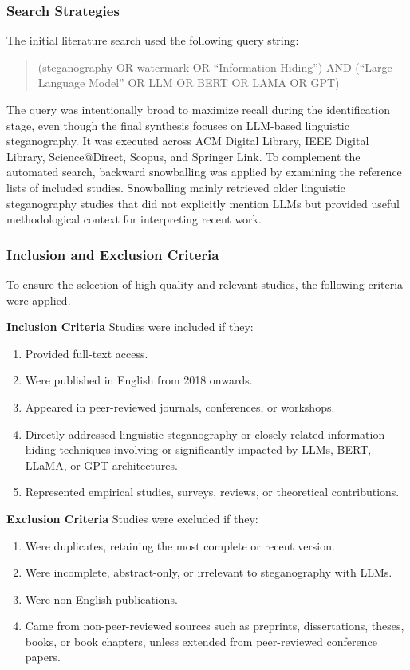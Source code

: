 \subsubsection{Search Strategies}
The initial literature search used the following query string:
\begin{quote}
	\small (steganography OR watermark OR ``Information Hiding'') AND (``Large Language Model'' OR LLM OR BERT OR LAMA OR GPT)
\end{quote}

The query was intentionally broad to maximize recall during the identification stage, even though the final synthesis focuses on LLM-based linguistic steganography. It was executed across ACM Digital Library, IEEE Digital Library, Science@Direct, Scopus, and Springer Link. To complement the automated search, backward snowballing was applied by examining the reference lists of included studies. Snowballing mainly retrieved older linguistic steganography studies that did not explicitly mention LLMs but provided useful methodological context for interpreting recent work.

\subsubsection{Inclusion and Exclusion Criteria}
To ensure the selection of high-quality and relevant studies, the following criteria were applied.

\textbf{Inclusion Criteria}
Studies were included if they:

\begin{enumerate}[label=IC\arabic*:]
	\item Provided full-text access.
	\item Were published in English from 2018 onwards.
	\item Appeared in peer-reviewed journals, conferences, or workshops.
	\item Directly addressed linguistic steganography or closely related information-hiding techniques involving or significantly impacted by LLMs, BERT, LLaMA, or GPT architectures.
	\item Represented empirical studies, surveys, reviews, or theoretical contributions.
\end{enumerate}

\textbf{Exclusion Criteria}
Studies were excluded if they:

\begin{enumerate}[label=EC\arabic*:]
	\item Were duplicates, retaining the most complete or recent version.
	\item Were incomplete, abstract-only, or irrelevant to steganography with LLMs.
	\item Were non-English publications.
	\item Came from non-peer-reviewed sources such as preprints, dissertations, theses, books, or book chapters, unless extended from peer-reviewed conference papers.
\end{enumerate}

